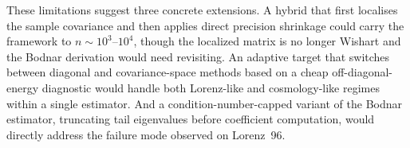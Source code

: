 These limitations suggest three concrete extensions. A hybrid that first localises the sample covariance and then applies direct precision shrinkage could carry the framework to $n \sim 10^3$--$10^4$, though the localized matrix is no longer Wishart and the Bodnar derivation would need revisiting. An adaptive target that switches between diagonal and covariance-space methods based on a cheap off-diagonal-energy diagnostic would handle both Lorenz-like and cosmology-like regimes within a single estimator. And a condition-number-capped variant of the Bodnar estimator, truncating tail eigenvalues before coefficient computation, would directly address the failure mode observed on Lorenz~96.
